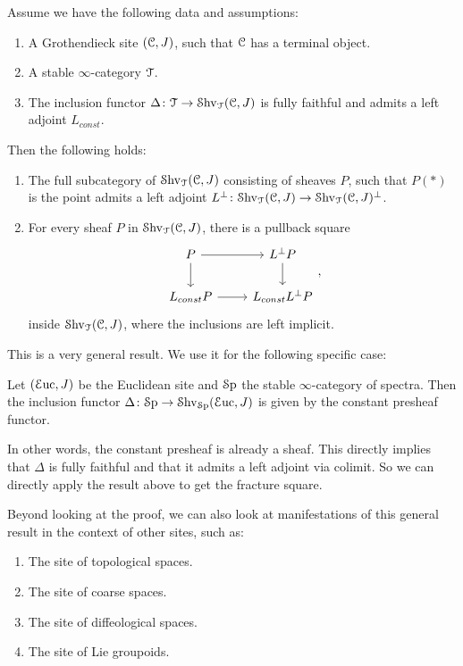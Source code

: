 \documentclass[10pt]{amsart}
\begin{document}
\begin{proposition}
  Assume we have the following data and assumptions:
  \begin{enumerate}
    \item A Grothendieck site $(\mathcal{C},J)$, such that $\mathcal{C}$ has a terminal object.
    \item A stable $\infty$-category $\mathcal{T}$.
    \item The inclusion functor $\Delta\colon \mathcal{T} \to \mathcal{S}\mathrm{hv}_{\mathcal{T}}(\mathcal{C},J)$ is fully faithful and admits a left adjoint $L_{const}$. 
  \end{enumerate}
  Then the following holds:
  \begin{enumerate}
    \item The full subcategory of $\mathcal{S}\mathrm{hv}_{\mathcal{T}}(\mathcal{C},J)$ consisting of sheaves $P$, such that $P(*)$ is the point admits a left adjoint $L^{\bot}\colon \mathcal{S}\mathrm{hv}_{\mathcal{T}}(\mathcal{C},J) \to \mathcal{S}\mathrm{hv}_{\mathcal{T}}(\mathcal{C},J)^\bot$.
    \item For every sheaf $P$ in $\mathcal{S}\mathrm{hv}_{\mathcal{T}}(\mathcal{C},J)$, there is a pullback square
    \[
    \begin{tikzcd}
      P \arrow[r] \arrow[d] & L^{\bot}P \arrow[d] \\
      L_{const}P \arrow[r] & L_{const}L^{\bot}P
    \end{tikzcd},
    \]
    inside $\mathcal{S}\mathrm{hv}_{\mathcal{T}}(\mathcal{C},J)$, where the inclusions are left implicit.
  \end{enumerate} 
\end{proposition}

This is a very general result. We use it for the following specific case:
\begin{lemma}
 Let $(\mathcal{E}\mathrm{uc},J)$ be the Euclidean site and $\mathcal{S}\mathrm{p}$ the stable $\infty$-category of spectra. Then the inclusion functor $\Delta\colon \mathcal{S}\mathrm{p} \to \mathcal{S}\mathrm{hv}_{\mathcal{S}\mathrm{p}}(\mathcal{E}\mathrm{uc},J)$ is given by the constant presheaf functor.
\end{lemma}

In other words, the constant presheaf is already a sheaf. This directly implies that $\Delta$ is fully faithful and that it admits a left adjoint via colimit. So we can directly apply the result above to get the fracture square.

Beyond looking at the proof, we can also look at manifestations of this general result in the context of other sites, such as:
\begin{enumerate}
  \item The site of topological spaces.
  \item The site of coarse spaces.
  \item The site of diffeological spaces.
  \item The site of Lie groupoids.
\end{enumerate}
\end{document}
